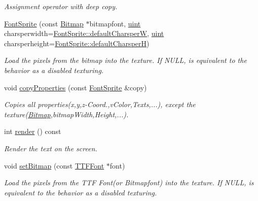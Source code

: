 \begin{DoxyCompactItemize}
\begin{DoxyCompactList}\small\item\em Assignment operator with deep copy. \item\end{DoxyCompactList}\item 
\hyperlink{class_f2_c_1_1_font_sprite_a5c7ad536cebfee0660823bef1947e668}{FontSprite} (const \hyperlink{class_f2_c_1_1_bitmap}{Bitmap} $\ast$bitmapfont, \hyperlink{namespace_f2_c_a58be2bac9eb3e3c99cb41b6008bf4fae}{uint} charsperwidth=\hyperlink{class_f2_c_1_1_font_sprite_a4391313f8fd3a47ae2b9941d8540a098}{FontSprite::defaultCharsperW}, \hyperlink{namespace_f2_c_a58be2bac9eb3e3c99cb41b6008bf4fae}{uint} charsperheight=\hyperlink{class_f2_c_1_1_font_sprite_a2f7ed6629876bb340c5b3121d0c3a2b0}{FontSprite::defaultCharsperH})
\begin{DoxyCompactList}\small\item\em Load the pixels from the bitmap into the texture. If NULL, is equivalent to the behavior as a disabled texturing. \item\end{DoxyCompactList}\item 
void \hyperlink{class_f2_c_1_1_font_sprite_a36a224f59737fb06c4d79ee48b7e4068}{copyProperties} (const \hyperlink{class_f2_c_1_1_font_sprite}{FontSprite} \&copy)
\begin{DoxyCompactList}\small\item\em Copies all properties(x,y,z-\/Coord.,vColor,Texts,...), except the texture(\hyperlink{class_f2_c_1_1_bitmap}{Bitmap},bitmapWidth,Height,...). \item\end{DoxyCompactList}\item 
int \hyperlink{class_f2_c_1_1_font_sprite_a2c6fc77162983dc4d750258144410272}{render} () const 
\begin{DoxyCompactList}\small\item\em Render the text on the screen. \item\end{DoxyCompactList}\item 
void \hyperlink{class_f2_c_1_1_font_sprite_aa6d0f6588a8abc3d75b73d0623d28802}{setBitmap} (const \hyperlink{class_f2_c_1_1_t_t_f_font}{TTFFont} $\ast$font)
\begin{DoxyCompactList}\small\item\em Load the pixels from the TTF Font(or Bitmapfont) into the texture. If NULL, is equivalent to the behavior as a disabled texturing. \item\end{DoxyCompactList}\item 

\end{DoxyCompactItemize}

